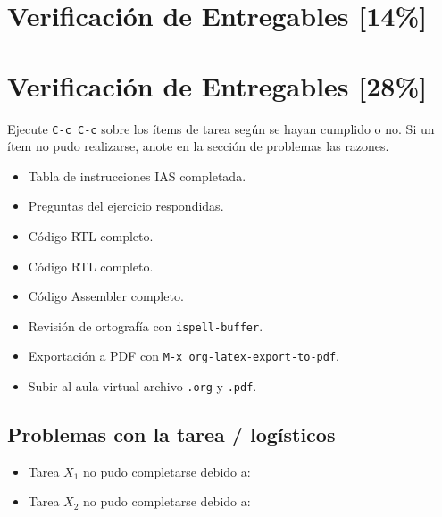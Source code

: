 \documentclass{article}
\begin{document}
\section{Verificación de Entregables [14\%]}
\label{sec:org488e835}
\section{Verificación de Entregables [28\%]}
\label{sec:orgc4381b9}

Ejecute \texttt{C-c C-c} sobre los ítems de tarea según se hayan cumplido o
no. Si un ítem no pudo realizarse, anote en la sección de problemas
las razones.

\begin{itemize}
\item[{$\square$}] Tabla de instrucciones IAS completada.
\item[{$\square$}] Preguntas del ejercicio respondidas.
\item[{$\square$}] Código RTL completo.
\item[{$\boxtimes$}] Código RTL completo.
\item[{$\boxtimes$}] Código Assembler completo.
\item[{$\square$}] Revisión de ortografía con \texttt{ispell-buffer}.
\item[{$\square$}] Exportación a PDF con \texttt{M-x org-latex-export-to-pdf}.
\item[{$\square$}] Subir al aula virtual archivo \texttt{.org} y \texttt{.pdf}.
\end{itemize}

\subsection{Problemas con la tarea / logísticos}
\label{sec:org1fa6f45}
\label{sec:org701822f}

\begin{itemize}
\item Tarea \(X_1\) no pudo completarse debido a:
\item Tarea \(X_2\) no pudo completarse debido a:
\end{itemize}

\printbibliography
\end{document}
